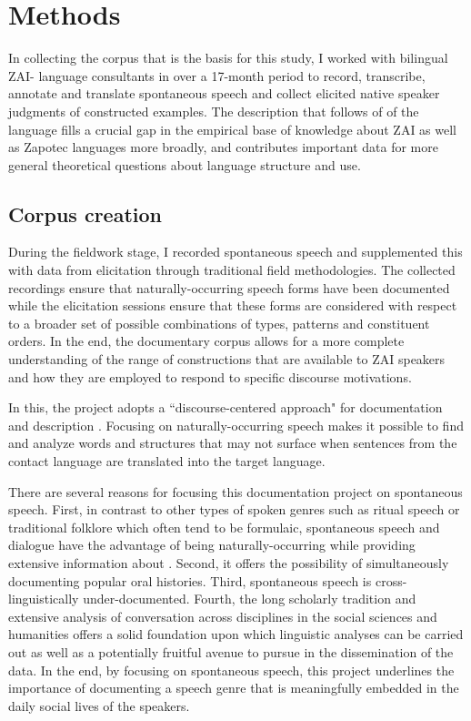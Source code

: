 \section{Methods}

\largerpage[-1]
In collecting the corpus that is the basis for this study, I worked with bilingual ZAI- language consultants in  over a 17-month period to record, transcribe, annotate and translate spontaneous speech and collect elicited native speaker judgments of constructed examples. The description that follows of  of the language fills a crucial gap in the empirical base of knowledge about ZAI as well as Zapotec languages more broadly, and contributes important data for more general theoretical questions about language structure and use.

\subsection{Corpus creation}

During the fieldwork stage, I recorded spontaneous speech and supplemented this with data from elicitation through traditional field methodologies. The collected recordings ensure that naturally-occurring speech forms have been documented while the elicitation sessions  ensure that these forms are considered with respect to a broader set of possible combinations of  types,  patterns and constituent orders. In the end, the documentary corpus allows for a more complete understanding of the range of constructions that are available to ZAI speakers and how they are employed to respond to specific discourse motivations.

In this, the project adopts a ``discourse-centered approach" for documentation and description \citep{sherzer1987}. Focusing on naturally-occurring speech makes it possible to find and analyze words and structures that may not surface when sentences from the contact language are translated into the target language. 

There are several reasons for focusing this documentation project on spontaneous speech. First, in contrast to other types of spoken genres such as ritual speech or traditional folklore which often tend to be formulaic, spontaneous speech and dialogue have the advantage of being naturally-occurring while providing extensive information about . Second, it offers the possibility of simultaneously documenting popular oral histories. Third, spontaneous speech is cross-linguistically under-documented. Fourth, the long scholarly tradition and extensive analysis of conversation across disciplines in the social sciences and humanities offers a solid foundation upon which linguistic analyses can be carried out as well as a potentially fruitful avenue to pursue in the dissemination of the data. In the end, by focusing on spontaneous speech, this project underlines the importance of documenting a speech genre that is meaningfully embedded in the daily social lives of the speakers. 


